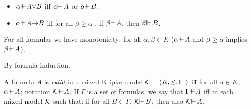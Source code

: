 \documentclass{jancl}
\begin{document}
\begin{definition}
\begin{itemize}
\item  ${\alpha} {\ifmmode{ {\vdash}\mkern-7.6mu
{\vdash}\mkern2mu}\else{ {\vdash}\kern-.28em
{\vdash}\hskip1pt\ }\fi\relax} A {\vee} B $ iff ${\alpha} {\ifmmode{ {\vdash}\mkern-7.6mu
{\vdash}\mkern2mu}\else{ {\vdash}\kern-.28em
{\vdash}\hskip1pt\ }\fi\relax} A$ or ${\alpha} {\ifmmode{ {\vdash}\mkern-7.6mu
{\vdash}\mkern2mu}\else{ {\vdash}\kern-.28em
{\vdash}\hskip1pt\ }\fi\relax}
B $.

\item ${\alpha} {\ifmmode{ {\vdash}\mkern-7.6mu
{\vdash}\mkern2mu}\else{ {\vdash}\kern-.28em
{\vdash}\hskip1pt\ }\fi\relax} A {\rightarrow} B $ iff for all ${\beta} {\geq} {\alpha}$ , if ${\beta}
{\ifmmode{ {\vdash}\mkern-7.6mu
{\vdash}\mkern2mu}\else{ {\vdash}\kern-.28em
{\vdash}\hskip1pt\ }\fi\relax} A$, then ${\beta} {\ifmmode{ {\vdash}\mkern-7.6mu
{\vdash}\mkern2mu}\else{ {\vdash}\kern-.28em
{\vdash}\hskip1pt\ }\fi\relax} B$.
\end{itemize}
\end{definition}

\begin{lemma}
For all formulas we have monotonicity: for all ${\alpha},{\beta} \in K$ (${\alpha}
{\ifmmode{ {\vdash}\mkern-7.6mu
{\vdash}\mkern2mu}\else{ {\vdash}\kern-.28em
{\vdash}\hskip1pt\ }\fi\relax} A$ and ${\beta} \geq {\alpha}$ implies ${\beta} {\ifmmode{ {\vdash}\mkern-7.6mu
{\vdash}\mkern2mu}\else{ {\vdash}\kern-.28em
{\vdash}\hskip1pt\ }\fi\relax} A$).
\end{lemma}

\begin{proof*}
By formula induction.
\end{proof*}

\begin{definition}
A formula $A$ is \emph{valid} in a mixed Kripke model ${\cal
K}=(K,{\leq},{\ifmmode{ {\vdash}\mkern-7.6mu
{\vdash}\mkern2mu}\else{ {\vdash}\kern-.28em
{\vdash}\hskip1pt\ }\fi\relax})$ iff for all ${\alpha} \in K$, ${\alpha} {\ifmmode{ {\vdash}\mkern-7.6mu
{\vdash}\mkern2mu}\else{ {\vdash}\kern-.28em
{\vdash}\hskip1pt\ }\fi\relax} A$;
notation ${\cal K} {\ifmmode{ {\vdash}\mkern-7.6mu
{\vdash}\mkern2mu}\else{ {\vdash}\kern-.28em
{\vdash}\hskip1pt\ }\fi\relax} A$. If ${\Gamma}$ is a set of formulas, we
say that ${\Gamma} {\ifmmode{ {\vdash}\mkern-7.6mu
{\vdash}\mkern2mu}\else{ {\vdash}\kern-.28em
{\vdash}\hskip1pt\ }\fi\relax} A$ iff in each  mixed model ${\cal K}$ such
that: if for all $B \in {\Gamma}$, ${\cal K} {\ifmmode{ {\vdash}\mkern-7.6mu
{\vdash}\mkern2mu}\else{ {\vdash}\kern-.28em
{\vdash}\hskip1pt\ }\fi\relax} B$, then also
${\cal K} {\ifmmode{ {\vdash}\mkern-7.6mu
{\vdash}\mkern2mu}\else{ {\vdash}\kern-.28em
{\vdash}\hskip1pt\ }\fi\relax} A$.
\end{definition}
\end{document}
